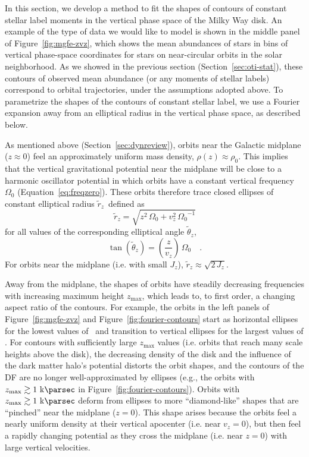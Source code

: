 \documentclass[modern]{aastex631}
\newcommand{\freqzero}{\ensuremath{\Omega_0}}
\newcommand{\rzp}{\ensuremath{\tilde{r}_z}}
\newcommand{\thzp}{\ensuremath{\tilde{\theta}_z}}
\begin{document}
In this section, we develop a method to fit the shapes of contours of constant stellar
label moments in the vertical phase space of the Milky Way disk.
An example of the type of data we would like to model is shown in the middle panel of
Figure~\ref{fig:mgfe-zvz}, which shows the mean  abundances of stars in
bins of vertical phase-space coordinates for stars on near-circular orbits in the solar
neighborhood.
As we showed in the previous section (Section~\ref{sec:oti-stat}), these contours of
observed mean  abundance (or any moments of stellar labels) correspond to
orbital trajectories, under the assumptions adopted above.
To parametrize the shapes of the contours of constant stellar label, we use a Fourier
expansion away from an elliptical radius in the vertical phase space, as described
below.

As mentioned above (Section~\ref{sec:dynreview}), orbits near the Galactic midplane ($z
\approx 0$) feel an approximately uniform mass density, $\rho(z) \approx \rho_0$.
This implies that the vertical gravitational potential near the midplane will be close
to a harmonic oscillator potential in which orbits have a constant vertical frequency
$\freqzero$ (Equation~\ref{eq:freqzero}).
These orbits therefore trace closed ellipses of constant elliptical radius \rzp\ defined
as
\begin{equation}
    \rzp = \sqrt{z^2 \, \freqzero + v_z^2 \, \freqzero^{-1}} \label{eq:rzp}
\end{equation}
for all values of the corresponding elliptical angle \thzp,
\begin{equation}
    \tan (\thzp) = \left(\frac{z}{v_z}\right) \, \freqzero \quad .
    \label{eq:thetazp}
\end{equation}
For orbits near the midplane (i.e. with small $J_z$), $\rzp \approx \sqrt{2\,J_z}$.

Away from the midplane, the shapes of orbits have steadily decreasing frequencies with
increasing maximum height $z_{\textrm{max}}$, which leads to, to first order, a changing
aspect ratio of the contours.
For example, the orbits in the left panels of Figure~\ref{fig:mgfe-zvz} and
Figure~\ref{fig:fourier-contours} start as horizontal ellipses for the lowest values of
\zmax\ and transition to vertical ellipses for the largest values of \zmax.
For contours with sufficiently large $z_{\textrm{max}}$ values (i.e. orbits that reach
many scale heights above the disk), the decreasing density of the disk and the influence
of the dark matter halo's potential distorts the orbit shapes, and the contours of the
DF are no longer well-approximated by ellipses (e.g., the orbits with $\zmax \gtrsim
1~\kpc$ in Figure~\ref{fig:fourier-contours}).
Orbits with $z_{\textrm{max}} \gtrsim 1~\kpc$ deform from ellipses to more
``diamond-like'' shapes that are ``pinched'' near the midplane ($z=0$).
This shape arises because the orbits feel a nearly uniform density at their vertical
apocenter (i.e. near $v_z = 0$), but then feel a rapidly changing potential as they
cross the midplane (i.e. near $z=0$) with large vertical velocities.
\end{document}
